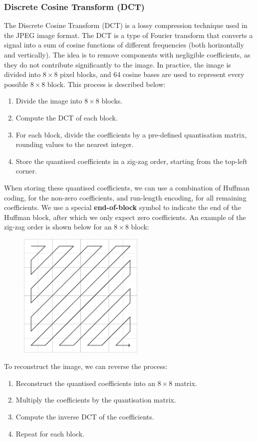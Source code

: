\documentclass{article}
\begin{document}
\subsubsection{Discrete Cosine Transform (DCT)}
The Discrete Cosine Transform (DCT) is a lossy compression technique
used in the JPEG image format. The DCT is a type of Fourier transform
that converts a signal into a sum of cosine functions of different
frequencies (both horizontally and vertically). The idea is to remove
components with negligible coefficients, as they do not contribute
significantly to the image. In practice, the image is divided into \(8
\times 8\) pixel blocks, and 64 cosine bases are used to represent
every possible \(8 \times 8\) block. This process is described below:
\begin{enumerate}
    \item Divide the image into \(8 \times 8\) blocks.
    \item Compute the DCT of each block.
    \item For each block, divide the coefficients by a pre-defined
          quantisation matrix, rounding values to the nearest integer.
    \item Store the quantised coefficients in a zig-zag order, starting
          from the top-left corner.
\end{enumerate}
When storing these quantised coefficients, we can use a combination of
Huffman coding, for the non-zero coefficients, and run-length encoding,
for all remaining coefficients. We use a special \textbf{end-of-block}
symbol to indicate the end of the Huffman block, after which we only
expect zero coefficients. An example of the zig-zag order is shown
below for an \(8 \times 8\) block:
\begin{figure}[H]
    \centering
    \includegraphics[height = 6cm]{figures/zig-zag.pdf}
\end{figure}
To reconstruct the image, we can reverse the process:
\begin{enumerate}
    \item Reconstruct the quantised coefficients into an \(8 \times 8\)
          matrix.
    \item Multiply the coefficients by the quantisation matrix.
    \item Compute the inverse DCT of the coefficients.
    \item Repeat for each block.
\end{enumerate}
\end{document}
